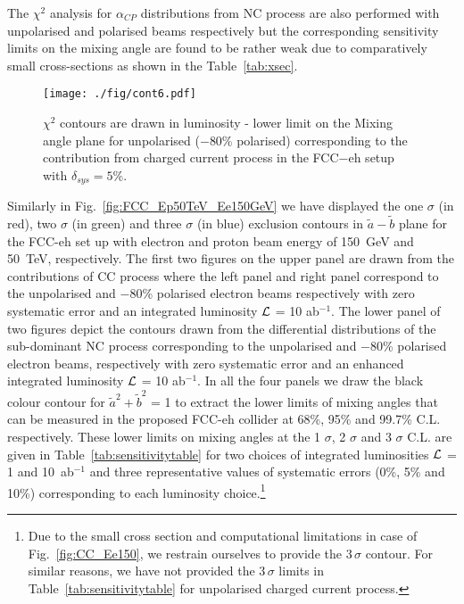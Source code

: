 \documentclass[pdftex,twocolumn,epjc3]{svjour3}          %
\begin{document}
\par The $\chi^2$ analysis for $\alpha_{CP}$ distributions from NC process are also performed with unpolarised and polarised beams respectively  but the corresponding sensitivity limits on the mixing angle are found to be rather weak due to comparatively small cross-sections as shown in the Table~\ref{tab:xsec}. 
\begin{figure}[t]
\texttt{[image: ./fig/cont6.pdf]}
\caption{  {\small $\chi^2$ contours are drawn in luminosity - lower limit on the Mixing angle plane for unpolarised ($-$80\% polarised) corresponding to the contribution from charged current process in the FCC$-$eh setup with $\delta_{sys} = 5\%$.}}
	\label{fig:sensitivity_vs_lumi}
\end{figure}
%
\par Similarly in Fig.~\ref{fig:FCC_Ep50TeV_Ee150GeV} we have displayed the one $\sigma$ (in red), two $\sigma$ (in green) and three $\sigma$ (in blue) exclusion contours in  $\tilde a-\tilde b$ plane for the FCC-eh set up with electron and proton beam energy of 150~GeV and 50~TeV, respectively.  The first two figures on the upper panel  are drawn from the contributions of CC process where the  left panel  and right panel correspond to the unpolarised and $-$80\% polarised electron beams respectively with zero systematic error and an integrated luminosity $\cal L$ = 10 ab$^{-1}$. The lower panel of two figures depict the contours drawn from the differential distributions of the sub-dominant NC process  corresponding to the unpolarised and $-$80\% polarised electron beams, respectively with zero systematic error and an enhanced integrated luminosity $\cal L$ = 10 ab$^{-1}$. In all the four panels we draw the black colour contour for $\tilde a^2 +\tilde b^2$ = 1 to extract the  lower limits of mixing angles that can be measured in the proposed FCC-eh collider at 68\%, 95\% and 99.7\% C.L. respectively.  These lower limits on mixing angles at the 1 $\sigma$, 2 $\sigma$ and 3 $\sigma$ C.L. are given in Table~\ref{tab:sensitivitytable} for two choices of integrated luminosities $\cal L$ = 1 and 10~ab$^{-1}$ and three representative values  of  systematic errors (0\%, 5\% and 10\%) corresponding to each luminosity choice.\footnote{Due to the small cross section and computational limitations in case of Fig.~\ref{fig:CC_Ee150}, we restrain ourselves to provide the 3\,$\sigma$ contour. For similar reasons, we have not provided the 3\,$\sigma$ limits in Table~\ref{tab:sensitivitytable} for unpolarised charged current process.}
 
\end{document}
